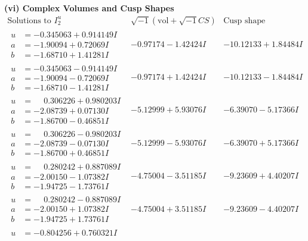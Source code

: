\documentclass[1p]{elsarticle_modified}
\theoremstyle{definition}
\newcommand{\I}{\sqrt{-1}}
\begin{document}
\newpage\flushleft \textbf{(vi) Complex Volumes and Cusp Shapes}
$$\begin{array}{c|c|c}  
\text{Solutions to }I^u_{2}& \I (\text{vol} + \sqrt{-1}CS) & \text{Cusp shape}\\
 \hline 
\begin{aligned}
u &= -0.345063 + 0.914149 I \\
a &= -1.90094 + 0.72069 I \\
b &= -1.68710 + 1.41281 I\end{aligned}
 & -0.97174 - 1.42424 I & -10.12133 + 1.84484 I \\ \hline\begin{aligned}
u &= -0.345063 - 0.914149 I \\
a &= -1.90094 - 0.72069 I \\
b &= -1.68710 - 1.41281 I\end{aligned}
 & -0.97174 + 1.42424 I & -10.12133 - 1.84484 I \\ \hline\begin{aligned}
u &= \phantom{-}0.306226 + 0.980203 I \\
a &= -2.08739 + 0.07130 I \\
b &= -1.86700 - 0.46851 I\end{aligned}
 & -5.12999 + 5.93076 I & -6.39070 - 5.17366 I \\ \hline\begin{aligned}
u &= \phantom{-}0.306226 - 0.980203 I \\
a &= -2.08739 - 0.07130 I \\
b &= -1.86700 + 0.46851 I\end{aligned}
 & -5.12999 - 5.93076 I & -6.39070 + 5.17366 I \\ \hline\begin{aligned}
u &= \phantom{-}0.280242 + 0.887089 I \\
a &= -2.00150 - 1.07382 I \\
b &= -1.94725 - 1.73761 I\end{aligned}
 & -4.75004 - 3.51185 I & -9.23609 + 4.40207 I \\ \hline\begin{aligned}
u &= \phantom{-}0.280242 - 0.887089 I \\
a &= -2.00150 + 1.07382 I \\
b &= -1.94725 + 1.73761 I\end{aligned}
 & -4.75004 + 3.51185 I & -9.23609 - 4.40207 I \\ \hline\begin{aligned}
u &= -0.804256 + 0.760321 I \\

\end{aligned}
\end{array}$$
\end{document}
